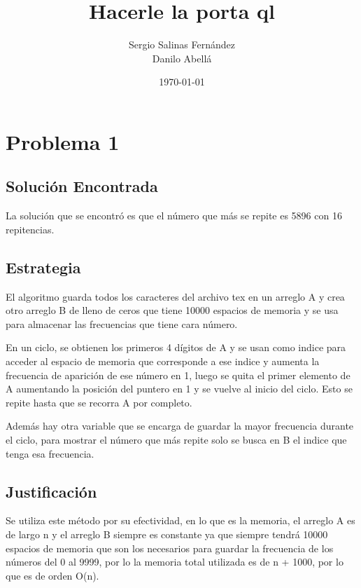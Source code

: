 \documentclass[12pt]{article}
\title{Hacerle la porta ql}								%
\author{Sergio Salinas Fern\'andez \\
Danilo Abellá}								%
\date{\today}											%
\begin{document}
\maketitle


\tableofcontents
\pagebreak



\section{Problema 1}

\subsection{Solución Encontrada}

La solución que se encontró es que el número que más se repite es 5896 con 16 repitencias.


\subsection{Estrategia}

El algoritmo guarda todos los caracteres del archivo tex en un arreglo A y crea otro arreglo B de lleno de ceros que tiene 10000 espacios de memoria y se usa para almacenar las frecuencias que tiene cara número.

En un ciclo, se obtienen los primeros 4 dígitos de A y se usan como indice para acceder al espacio de memoria que corresponde a ese indice y aumenta la frecuencia de aparición de ese número en 1, luego se quita el primer elemento de A aumentando la posición del puntero en 1 y se vuelve al inicio del ciclo. Esto se repite hasta que se recorra A por completo.


Además hay otra variable que se encarga de guardar la mayor frecuencia durante el ciclo, para mostrar el número que más repite solo se busca en B el indice que tenga esa frecuencia.

\subsection{Justificación}

Se utiliza este método por su efectividad, en lo que es la memoria, el arreglo A es de largo n y el arreglo B siempre es constante ya que siempre tendrá 10000 espacios de memoria que son los necesarios para guardar la frecuencia de los números del 0 al 9999, por lo la memoria total utilizada es de n + 1000, por lo que es de orden O(n).
\end{document}
